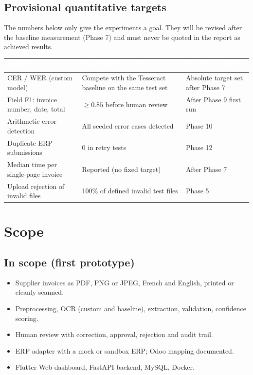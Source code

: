 \documentclass[11pt,a4paper]{report}
\newcommand{\hdr}[1]{\textcolor{white}{\sffamily\bfseries #1}}
\newcommand{\tblstart}{\rowcolors{2}{white}{rowgray}\arrayrulecolor{teal!60}}
\newcommand{\hdrrow}{\rowcolor{navy}}
\begin{document}
\section{Provisional quantitative targets}
\label{sec:targets}
\begin{warnbox}
The numbers below only give the experiments a goal. They will be revised after the baseline measurement (Phase 7) and must never be quoted in the report as achieved results.
\end{warnbox}
{\tblstart\small
\begin{longtable}{L{4.6cm}L{4.4cm}L{4.8cm}}
\hdrrow \hdr{Metric} & \hdr{Provisional target} & \hdr{Revision point}\\ \endhead
CER / WER (custom model) & Compete with the Tesseract baseline on the same test set & Absolute target set after Phase 7\\
Field F1: invoice number, date, total & $\geq 0.85$ before human review & After Phase 9 first run\\
Arithmetic-error detection & All seeded error cases detected & Phase 10\\
Duplicate ERP submissions & 0 in retry tests & Phase 12\\
Median time per single-page invoice & Reported (no fixed target) & After Phase 7\\
Upload rejection of invalid files & 100\% of defined invalid test files & Phase 5\\
\hline
\end{longtable}}

\chapter{Scope}
\section{In scope (first prototype)}
\begin{itemize}
\item Supplier invoices as PDF, PNG or JPEG, French and English, printed or cleanly scanned.
\item Preprocessing, OCR (custom and baseline), extraction, validation, confidence scoring.
\item Human review with correction, approval, rejection and audit trail.
\item ERP adapter with a mock or sandbox ERP; Odoo mapping documented.
\item Flutter Web dashboard, FastAPI backend, MySQL, Docker.
\end{itemize}
\end{document}
